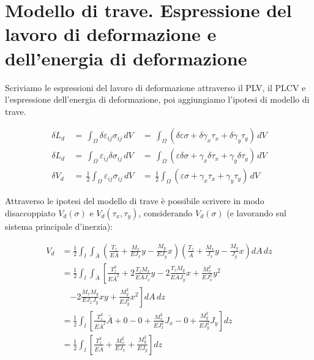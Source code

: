 \section{Modello di trave. Espressione del lavoro di deformazione e dell'energia di deformazione}

Scriviamo le espressioni del lavoro di deformazione attraverso il PLV, il PLCV e l'espressione dell'energia di deformazione, poi aggiungiamo l'ipotesi di modello di trave.

\begin{align*}
    \delta L_d \,&=\, \int_\Omega \delta\varepsilon_{ij}\sigma_{ij} \, dV \,&=\, \int_\Omega (\delta\varepsilon\sigma+ \delta\gamma_x\tau_x+ \delta\gamma_y\tau_y) \, dV\\
    \delta L_d \,&=\, \int_\Omega \varepsilon_{ij}\delta\sigma_{ij} \, dV \,&=\, \int_\Omega (\varepsilon\delta\sigma+ \gamma_x\delta\tau_x+ \gamma_y\delta\tau_y) \, dV\\
    \delta V_d \,&=\, \frac{1}{2}\int_\Omega \varepsilon_{ij}\sigma_{ij} \, dV \,&=\, \frac{1}{2}\int_\Omega (\varepsilon\sigma+ \gamma_x\tau_x+ \gamma_y\tau_y) \, dV
\end{align*}

Attraverso le ipotesi del modello di trave è possibile scrivere in modo disaccoppiato $V_d(\sigma)$ e $V_d(\tau_x,\tau_y)$, considerando $V_d(\sigma)$ (e lavorando sul sistema principale d'inerzia):

\begin{align*}
    V_d 
    &= \frac{1}{2} \int_l \int_{\bar{A}} 
    \left(
        \frac{T_z}{E \bar{A}} 
        + \frac{M_x}{E J_x} y 
        - \frac{M_y}{E J_y} x
    \right)
    \left(
        \frac{T_z}{\bar{A}} 
        + \frac{M_x}{J_x} y 
        - \frac{M_y}{J_y} x
    \right)
    dA \, dz \\
    &= \frac{1}{2} \int_l \int_{\bar{A}} 
    \left[
        \frac{T_z^2}{E \bar{A}^2}
        + 2 \frac{T_z M_x}{E \bar{A} J_x} y
        - 2 \frac{T_z M_y}{E \bar{A} J_y} x
        + \frac{M_x^2}{E J_x^2} y^2
    \right. \\
    & \quad \left.
        - 2 \frac{M_x M_y}{E J_x J_y} x y
        + \frac{M_y^2}{E J_y^2} x^2
    \right]
    dA \, dz \\
    &= \frac{1}{2} \int_l 
    \left[
        \frac{T_z^2}{E \bar{A}^2} \bar{A}
        + 0
        - 0
        + \frac{M_x^2}{E J_x^2} J_x
        - 0
        + \frac{M_y^2}{E J_y^2} J_y
    \right]
    dz \\
    &= \frac{1}{2} \int_l 
    \left[
        \frac{T_z^2}{E \bar{A}} 
        + \frac{M_x^2}{E J_x} 
        + \frac{M_y^2}{E J_y}
    \right] dz
\end{align*}

